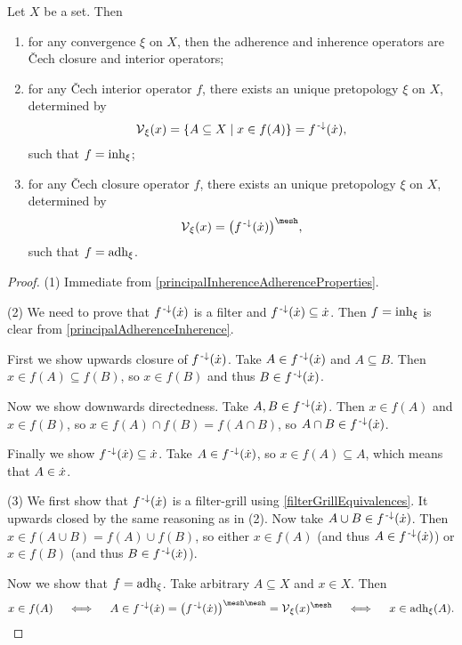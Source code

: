 \begin{proposition} \label{CechClosureInteriorPretopology}
Let $X$ be a set. Then
\begin{enumerate}
\item for any convergence $\xi$ on $X$, then the adherence and inherence operators are Čech closure and interior operators;
\item for any Čech interior operator $f$, there exists an unique pretopology $\xi$ on $X$, determined by
\[ \vicinity_\xi(x) = \setbuilder{A\subseteq X}{x\in f(A)} = f^{\preimf}(\pfilter{x}), \]
such that $f = \operatorname{inh}_\xi$;
\item for any Čech closure operator $f$, there exists an unique pretopology $\xi$ on $X$, determined by
\[ \vicinity_\xi(x) = \big(f^\preimf(\pfilter{x})\big)^\mesh, \]
such that $f = \operatorname{adh}_\xi$.
\end{enumerate}
\end{proposition}
\begin{proof}
(1) Immediate from \ref{principalInherenceAdherenceProperties}.

(2) We need to prove that $f^{{\text{\hspace{0.15em}-}\downarrow}}(\dot{x})$ is a filter and $f^{{\text{\hspace{0.15em}-}\downarrow}}(\dot{x})\subseteq \dot{x}$. Then $f = \operatorname{inh}_\xi$ is clear from \ref{principalAdherenceInherence}.

First we show upwards closure of $f^{{\text{\hspace{0.15em}-}\downarrow}}(\dot{x})$. Take $A\in f^{{\text{\hspace{0.15em}-}\downarrow}}(\dot{x})$ and $A\subseteq B$. Then $x\in f(A)\subseteq f(B)$, so $x\in f(B)$ and thus $B\in f^{{\text{\hspace{0.15em}-}\downarrow}}(\dot{x})$.

Now we show downwards directedness. Take $A,B\in f^{{\text{\hspace{0.15em}-}\downarrow}}(\dot{x})$. Then $x\in f(A)$ and $x\in f(B)$, so $x\in f(A)\cap f(B) = f(A\cap B)$, so $A\cap B\in f^{{\text{\hspace{0.15em}-}\downarrow}}(\dot{x})$.

Finally we show $f^{{\text{\hspace{0.15em}-}\downarrow}}(\dot{x})\subseteq \dot{x}$. Take $A\in f^{{\text{\hspace{0.15em}-}\downarrow}}(\dot{x})$, so $x\in f(A)\subseteq A$, which means that $A\in \dot{x}$.

(3) We first show that $f^{\text{\hspace{0.15em}-}\downarrow}(\dot{x})$ is a filter-grill using \ref{filterGrillEquivalences}. It upwards closed by the same reasoning as in (2). Now take $A\cup B\in f^{\text{\hspace{0.15em}-}\downarrow}(\dot{x})$. Then $x\in f(A\cup B) = f(A) \cup f(B)$, so either $x\in f(A)$ (and thus $A\in f^{\text{\hspace{0.15em}-}\downarrow}(\dot{x})$) or $x\in f(B)$ (and thus $B\in f^{\text{\hspace{0.15em}-}\downarrow}(\dot{x})$).

Now we show that $f = \operatorname{adh}_\xi$. Take arbitrary $A\subseteq X$ and $x\in X$. Then
\[ x\in f(A) \quad\iff\quad A\in f^\preimf(\pfilter{x}) = \big(f^\preimf(\pfilter{x})\big)^{\mesh\mesh} = \vicinity_\xi(x)^\mesh \quad\iff\quad x\in \adh_\xi(A). \]
\end{proof}

